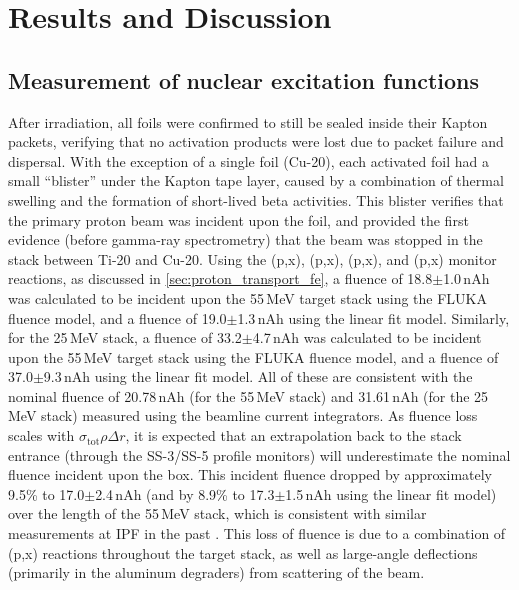 \section{\label{sec:results_fe}Results and Discussion}


\subsection{Measurement of nuclear excitation functions}

After irradiation, all foils were confirmed to still be sealed inside their Kapton packets, verifying that no activation products were lost due to packet failure and dispersal.
With the exception of a single foil (Cu-20), each activated foil had a small \enquote{blister} under the Kapton tape layer, caused by a combination of thermal swelling and the formation of short-lived beta activities.
This blister   verifies that the primary proton beam was incident upon the foil, and provided the first evidence (before gamma-ray spectrometry) that the beam was stopped in the stack between Ti-20 and Cu-20.
Using the (p,x), (p,x), (p,x), and (p,x) monitor reactions, as discussed in \autoref{sec:proton_transport_fe}, a fluence of 18.8$\pm$1.0\,nAh was calculated to be incident upon the 55\,MeV target stack using the FLUKA fluence model, and a  fluence of 19.0$\pm$1.3\,nAh using the linear fit model.
Similarly, for the 25\,MeV stack, a fluence of 33.2$\pm$4.7\,nAh was calculated to be incident upon the 55\,MeV target stack using the FLUKA fluence model, and a  fluence of 37.0$\pm$9.3\,nAh using the linear fit model.
All of these are consistent with the nominal fluence of 20.78\,nAh (for the 55\,MeV stack) and 31.61\,nAh (for the 25\,MeV stack) measured using the beamline current integrators.
As fluence loss scales with $\sigma_{\mathrm{tot}}\rho\Delta r$, it is expected that an extrapolation back to the stack entrance (through the SS-3/SS-5 profile monitors) will underestimate the nominal fluence incident upon the box.
This incident fluence dropped by approximately 9.5\% to  17.0$\pm$2.4\,nAh (and by 8.9\% to  17.3$\pm$1.5\,nAh using the linear fit model) over the length of the 55\,MeV stack, which is consistent with similar measurements at IPF in the past \cite{Voyles2018a,Graves2016}.
This loss of fluence is due to a combination of 
(p,x) reactions throughout the target stack, as well as large-angle deflections (primarily in the aluminum degraders) from scattering of the beam.




